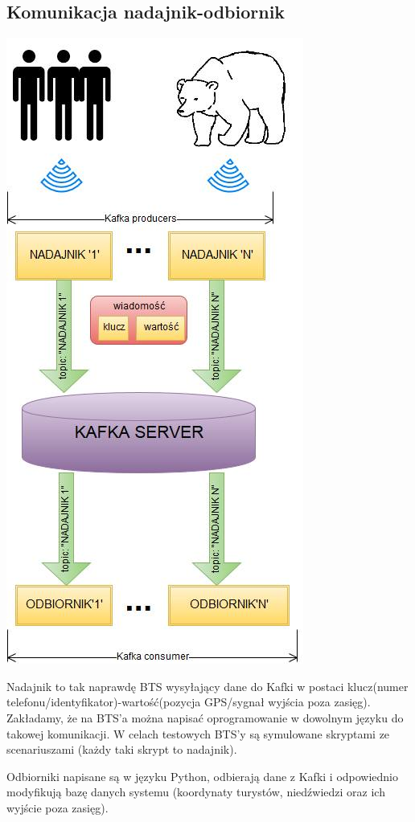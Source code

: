 \documentclass[a4paper,12pt]{article}
\begin{document}
\subsection{Komunikacja nadajnik-odbiornik}
\begin{center}
\includegraphics[scale=0.5]{kafka.png}
\end{center}
Nadajnik to tak naprawdę BTS wysyłający dane do Kafki w postaci klucz(numer telefonu/identyfikator)-wartość(pozycja GPS/sygnał wyjścia poza zasięg). Zakładamy, że na BTS'a można napisać oprogramowanie w dowolnym języku do takowej komunikacji. W celach testowych BTS'y są symulowane skryptami ze scenariuszami (każdy taki skrypt to nadajnik).

Odbiorniki napisane są w języku Python, odbierają dane z Kafki i odpowiednio modyfikują bazę danych systemu (koordynaty turystów, niedźwiedzi oraz ich wyjście poza zasięg).
\end{document}
